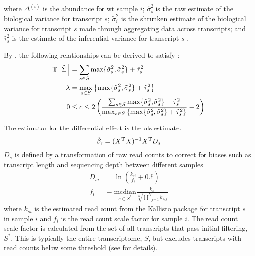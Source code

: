 %
where $\Delta^{(i)}$ is the abundance for \gls{wt} sample $i$; $\hat{\sigma}_s^2$ is the raw estimate of the biological variance for transcript $s$; $\tilde{\sigma}_i^2$ is the shrunken estimate of the biological variance for transcript $s$ made through aggregating data across transcripts; and $\hat{\tau}_s^2$ is the estimate of the inferential variance for transcript $s$ \cite{pimentelDifferentialAnalysisRNAseq2017}.

By , the following relationships can be derived to satisfy :
%
\begin{align}
  \mathbb{T} \left[ \hat{\Sigma} \right] & = \sum_{s \in S} \max\{ \hat{\sigma}_s^2, \tilde{\sigma}_s^2 \} + \hat{\tau}_s^2                                                                                                                                      \\
  \lambda              & = \max_{s \in S} \left\{ \max\{ \hat{\sigma}_s^2, \tilde{\sigma}_s^2 \} + \hat{\tau}_s^2 \right\}                                                                                                                     \\
  0                    & \le c \le 2 \left( \frac{\sum_{s \in S} \max\{ \hat{\sigma}_s^2, \tilde{\sigma}_s^2 \} + \hat{\tau}_s^2}{\max_{s \in S} \left\{ \max\{ \hat{\sigma}_s^2, \tilde{\sigma}_s^2 \} + \hat{\tau}_s^2 \right\}} - 2 \right)
  \label{eqn:js_scaling_bounds}
\end{align}

The estimator for the differential effect is the \gls{ols} estimate:
%
\begin{equation}
  \hat{\beta}_s = (X^{\mathrm{T}} X)^{-1} X^{\mathrm{T}} D_s
\end{equation}
%
$D_s$ is defined by a transformation of raw read counts to correct for biases such as transcript length and sequencing depth between different samples:
%
\begin{align}
  D_{si}   & = \ln \left(\frac{k_{si}}{f_i} + 0.5 \right)                                                            \\
  f_i & = \underset{s \in S^*}{\mathrm{median}} \frac{k_{si}}{\sqrt[N]{\underset{j = 1}{\overset{N}{\prod }}k_{s,j}}}
\end{align}
%
where $k_{si}$ is the estimated read count from the Kallisto package \cite{brayNearoptimalProbabilisticRNAseq2016} for transcript $s$ in sample $i$ and $f_i$ is the read count scale factor for sample $i$.
The read count scale factor is calculated from the set of all transcripts that pass initial filtering, $S^*$.
This is typically the entire transcriptome, $S$, but excludes transcripts with read counts below some threshold (see \cite[REF][]{pimentelDifferentialAnalysisRNAseq2017} for details).

